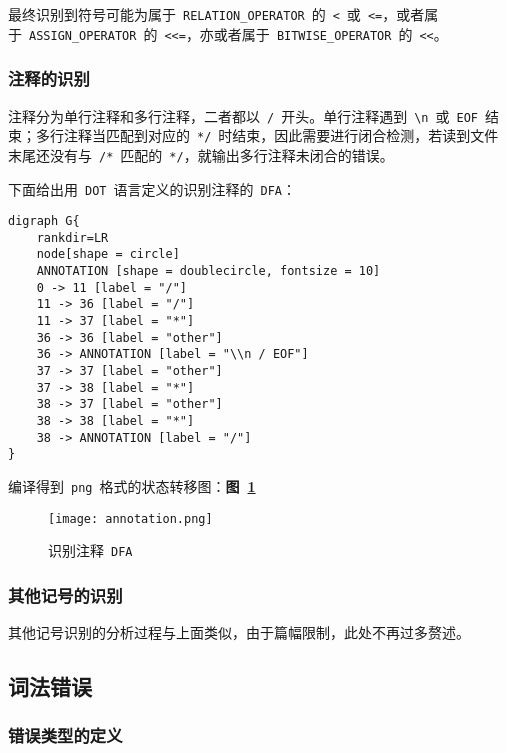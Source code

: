 \documentclass[lang=cn,11pt,a4paper]{paper}
\begin{document}
最终识别到符号可能为属于\ \lstinline{RELATION_OPERATOR}\ 的\ \lstinline{<}\ 或\ \lstinline{<=}，或者属于\ \lstinline{ASSIGN_OPERATOR}\ 的\ \lstinline{<<=}，亦或者属于\ \lstinline{BITWISE_OPERATOR}\ 的\ \lstinline{<<}。

\subsubsection{注释的识别}

注释分为单行注释和多行注释，二者都以\ \lstinline{/}\ 开头。单行注释遇到\ \lstinline{\n}\ 或\ \lstinline{EOF}\ 结束；多行注释当匹配到对应的\ \lstinline{*/}\ 时结束，因此需要进行闭合检测，若读到文件末尾还没有与\ \lstinline{/*}\ 匹配的\ \lstinline{*/}，就输出多行注释未闭合的错误。

下面给出用\ \lstinline{DOT}\ 语言定义的识别注释的\ \lstinline{DFA}：

\begin{lstlisting}
digraph G{
    rankdir=LR
    node[shape = circle]
    ANNOTATION [shape = doublecircle, fontsize = 10]
    0 -> 11 [label = "/"]
    11 -> 36 [label = "/"]
    11 -> 37 [label = "*"]
    36 -> 36 [label = "other"]
    36 -> ANNOTATION [label = "\\n / EOF"]
    37 -> 37 [label = "other"]
    37 -> 38 [label = "*"]
    38 -> 37 [label = "other"]
    38 -> 38 [label = "*"]
    38 -> ANNOTATION [label = "/"]
}
\end{lstlisting}

编译得到\ \lstinline{png}\ 格式的状态转移图：\textbf{图\ \ref{fig:识别注释的DFA}}

\begin{figure}[!htb]
    \centering
    \texttt{[image: annotation.png]}
    \caption{识别注释\ \lstinline{DFA}}
    \label{fig:识别注释的DFA}
\end{figure}


\subsubsection{其他记号的识别}

其他记号识别的分析过程与上面类似，由于篇幅限制，此处不再过多赘述。

\subsection{词法错误}

\subsubsection{错误类型的定义}
\end{document}
